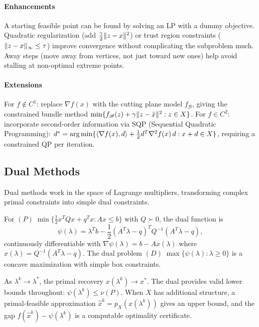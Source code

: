 \paragraph{Enhancements}

A starting feasible point can be found by solving an LP with a dummy objective.
Quadratic regularization (add $\frac{\gamma}{2}\lVert z - x\rVert^2$) or trust region constraints ($\lVert z - x\rVert_\infty \leq \tau$) improve convergence without complicating the subproblem much.
Away steps (move away from vertices, not just toward new ones) help avoid stalling at non-optimal extreme points.

\paragraph{Extensions}

For $f \notin C^1$: replace $\nabla f(x)$ with the cutting plane model $f_{\mathcal{B}}$, giving the constrained bundle method $\min\{f_{\mathcal{B}}(z) + \gamma\lVert z - \bar{x}\rVert^2 : z \in X\}$.
For $f \in C^2$: incorporate second-order information via SQP (Sequential Quadratic Programming): $d^* = \operatorname*{arg\,min}\{\langle\nabla f(x), d\rangle + \frac{1}{2} d^T \nabla^2 f(x)\, d : x + d \in X\}$, requiring a constrained QP per iteration.


\subsection{Dual Methods}\label{sec:dual-methods}

Dual methods work in the space of Lagrange multipliers, transforming complex primal constraints into simple dual constraints.

For $(P)\; \min\{\frac{1}{2} x^T Q x + q^T x : Ax \leq b\}$ with $Q \succ 0$, the dual function is
\begin{equation}\label{eq:dual-function-qp}
	\psi(\lambda) = \lambda^T b - \frac{1}{2}(A^T\lambda - q)^T Q^{-1}(A^T\lambda - q),
\end{equation}
continuously differentiable with $\nabla\psi(\lambda) = b - Ax(\lambda)$ where $x(\lambda) = Q^{-1}(A^T\lambda - q)$.
The dual problem $(D)\; \max\{\psi(\lambda) : \lambda \geq 0\}$ is a concave maximization with simple box constraints.

As $\lambda^k \to \lambda^*$, the primal recovery $x(\lambda^k) \to x^*$.
The dual provides valid lower bounds throughout: $\psi(\lambda^k) \leq \nu(P)$.
When $X$ has additional structure, a primal-feasible approximation $\hat{x}^k = p_X(x(\lambda^k))$ gives an upper bound, and the gap $f(\hat{x}^k) - \psi(\lambda^k)$ is a computable optimality certificate.

